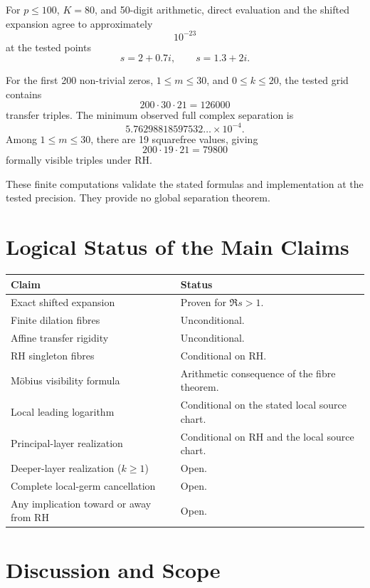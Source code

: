 \documentclass[11pt,a4paper]{article}
\theoremstyle{remark}
\begin{document}
For $p\le100$, $K=80$, and 50-digit arithmetic, direct evaluation and the shifted expansion agree to approximately
\[
10^{-23}
\]
at the tested points
\[
s=2+0.7i,\qquad s=1.3+2i.
\]

For the first 200 non-trivial zeros, $1\le m\le30$, and $0\le k\le20$, the tested grid contains
\[
200\cdot30\cdot21=126000
\]
transfer triples. The minimum observed full complex separation is
\[
\boxed{5.76298818597532\ldots\times10^{-4}.}
\]
Among $1\le m\le30$, there are 19 squarefree values, giving
\[
200\cdot19\cdot21=79800
\]
formally visible triples under RH.

These finite computations validate the stated formulas and implementation at the tested precision. They provide no global separation theorem.

\section{Logical Status of the Main Claims}

\begin{center}
\begin{tabular}{p{}p{}}
\toprule
\textbf{Claim} & \textbf{Status}\\
\midrule
Exact shifted expansion & Proven for $\Re s>1$.\\
Finite dilation fibres & Unconditional.\\
Affine transfer rigidity & Unconditional.\\
RH singleton fibres & Conditional on RH.\\
Möbius visibility formula & Arithmetic consequence of the fibre theorem.\\
Local leading logarithm & Conditional on the stated local source chart.\\
Principal-layer realization & Conditional on RH and the local source chart.\\
Deeper-layer realization ($k\ge1$) & Open.\\
Complete local-germ cancellation & Open.\\
Any implication toward or away from RH & Open.\\
\bottomrule
\end{tabular}
\end{center}

\section{Discussion and Scope}
\end{document}
